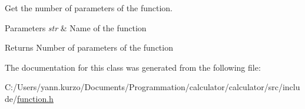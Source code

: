Get the number of parameters of the function. 


\begin{DoxyParams}{Parameters}
{\em str} & Name of the function \\
\hline
\end{DoxyParams}
\begin{DoxyReturn}{Returns}
Number of parameters of the function 
\end{DoxyReturn}


The documentation for this class was generated from the following file\+:\begin{DoxyCompactItemize}
\item 
C\+:/\+Users/yann.\+kurzo/\+Documents/\+Programmation/calculator/calculator/src/include/\hyperlink{function_8h}{function.\+h}\end{DoxyCompactItemize}
